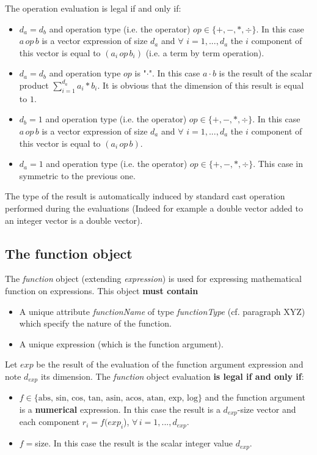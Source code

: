 \documentclass[11pt]{amsart}
\begin{document}
The operation evaluation is legal if and only if:
\begin{itemize}
\item $d_a=d_b$ and operation type (i.e. the operator) $op \in \{ + , - , \ast , \div \}$. In this case $a \, op \, b$ is a vector expression of size $d_a$ and $\forall$ $i=1,...,d_a$ the $i$ component of this vector is equal to
$(a_i \, op \,b_i)$ (i.e. a term by term operation).
\item $d_a = d_b$ and operation type $op$ is "$\cdot$". In this case $a \cdot b$ is the result of the scalar product $\sum_{i =1}^{d_a} a_i \ast b_i$. It is obvious that the dimension of this result is equal to $1$.
\item $d_b=1$ and operation type (i.e. the operator) $op \in \{ + , - , \ast , \div \}$. In this case $a \, op \, b$ is a vector expression of size $d_a$ and $\forall$ $i=1,...,d_a$ the $i$ component of this vector is equal to
$(a_i \, op \,b)$.
\item $d_a=1$ and operation type (i.e. the operator) $op \in \{ + , - , \ast , \div \}$. This case in symmetric to the previous one.
\end{itemize}

The type of the result is automatically induced by standard cast operation performed during the evaluations (Indeed for example a double vector added to an integer vector is a double vector).  

\subsection{The function object}\label{par02_05}
The {\it function} object (extending {\it expression}) is used for expressing mathematical function on expressions.
This object {\bf must contain} 
\begin{itemize}
\item A unique attribute {\it functionName} of type {\it functionType} (cf. paragraph XYZ) which specify the nature of the function.
\item A unique expression (which is the function argument).\\
\end{itemize}
Let $exp$ be the result of the evaluation of the function argument expression and note $d_{exp}$ its dimension.
The {\it function} object evaluation {\bf is legal if and only if}:
\begin{itemize}
\item $f  \in \{ \mbox{abs, sin, cos, tan, asin, acos, atan, exp, log} \}$ and the function argument is a {\bf numerical} expression. In this case the  result  is a $d_{exp}$-size vector and each component  $r_i = f(exp_i$), $\forall \, i=1,...,d_{exp}$.
\item $f=$size. In this case the result is the scalar integer value $d_{exp}$. 
\end{itemize}
\end{document}
